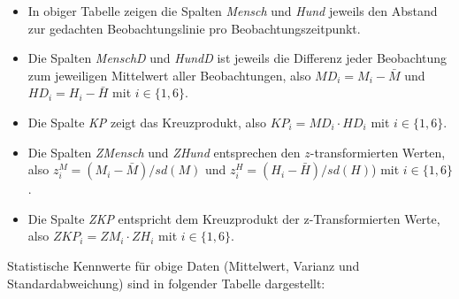 \documentclass[
]{article}
\providecommand{\tightlist}{%
  \setlength{\itemsep}{0pt}\setlength{\parskip}{0pt}}
\begin{document}
\begin{itemize}
\tightlist
\item
  In obiger Tabelle zeigen die Spalten \emph{Mensch} und \emph{Hund} jeweils den Abstand zur gedachten Beobachtungslinie pro Beobachtungszeitpunkt.
\item
  Die Spalten \emph{MenschD} und \emph{HundD} ist jeweils die Differenz jeder Beobachtung zum jeweiligen Mittelwert aller Beobachtungen, also \(MD_i = M_i - \bar{M}\) und \(HD_i = H_i - \bar{H}\) mit \(i \in \{1,6\}\).
\item
  Die Spalte \emph{KP} zeigt das Kreuzprodukt, also \(KP_i = MD_i \cdot HD_i\) mit \(i \in \{1,6\}\).
\item
  Die Spalten \emph{ZMensch} und \emph{ZHund} entsprechen den \(z\)-transformierten Werten, also \(z_i^M = (M_i - \bar{M}) / sd(M)\) und \(z_i^H = (H_i - \bar{H}) / sd(H)\)) mit \(i \in \{1,6\}\).
\item
  Die Spalte \emph{ZKP} entspricht dem Kreuzprodukt der z-Transformierten Werte, also \(ZKP_i = ZM_i \cdot ZH_i\) mit \(i \in \{1,6\}\).
\end{itemize}

Statistische Kennwerte für obige Daten (Mittelwert, Varianz und Standardabweichung) sind in folgender Tabelle dargestellt:
\end{document}
